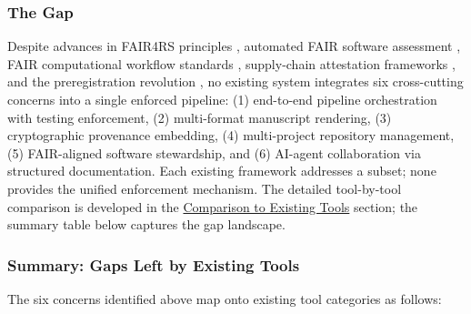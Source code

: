 \documentclass[
  english,
]{article}
\newcounter{none} %
\begin{document}
\subsubsection{The Gap}\label{the-gap}

Despite advances in FAIR4RS principles
\citep{barker2022fair4rs, lamprecht2020towards}, automated FAIR software
assessment \citep{garijo2024fairsoft}, FAIR computational workflow
standards \citep{goble2020fair}, supply-chain attestation frameworks
\citep{torresarias2019intoto, openssf2023slsa}, and the preregistration
revolution \citep{nosek2018preregistration}, no existing system
integrates six cross-cutting concerns into a single enforced pipeline:
(1) end-to-end pipeline orchestration with testing enforcement, (2)
multi-format manuscript rendering, (3) cryptographic provenance
embedding, (4) multi-project repository management, (5) FAIR-aligned
software stewardship, and (6) AI-agent collaboration via structured
documentation. Each existing framework addresses a subset; none provides
the unified enforcement mechanism. The detailed tool-by-tool comparison
is developed in the
\href{05c_comparison.md\#comparison-to-existing-tools}{Comparison to
Existing Tools} section; the summary table below captures the gap
landscape.

\subsubsection{Summary: Gaps Left by Existing
Tools}\label{summary-gaps-left-by-existing-tools}

The six concerns identified above map onto existing tool categories as
follows:
\end{document}
